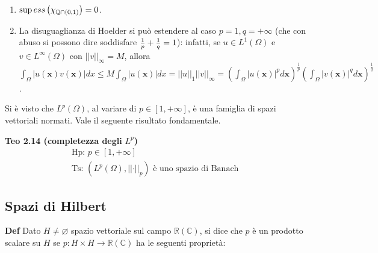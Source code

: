 \documentclass{article}
\begin{document}
\begin{enumerate}
\item $\sup ess\left( \chi _{%
\mathbb{Q}
\cap \left( 0,1\right) }\right) =0$.

\item La disuguaglianza di Hoelder si pu\`{o} estendere al caso $%
p=1,q=+\infty $ (che con abuso si possono dire soddisfare $\frac{1}{p}+\frac{%
1}{q}=1$): infatti, se $u\in L^{1}\left( \Omega \right) $ e $v\in L^{\infty
}\left( \Omega \right) $ con $\left\vert \left\vert v\right\vert \right\vert
_{\infty }=M$, allora $\int_{\Omega }\left\vert u\left( \mathbf{x}\right)
v\left( \mathbf{x}\right) \right\vert dx\leq M\int_{\Omega }\left\vert
u\left( \mathbf{x}\right) \right\vert dx=\left\vert \left\vert u\right\vert
\right\vert _{1}\left\vert \left\vert v\right\vert \right\vert _{\infty
}=\left( \int_{\Omega }\left\vert u\left( \mathbf{x}\right) \right\vert ^{p}d%
\mathbf{x}\right) ^{\frac{1}{p}}\left( \int_{\Omega }\left\vert v\left( 
\mathbf{x}\right) \right\vert ^{q}d\mathbf{x}\right) ^{\frac{1}{q}}$.
\end{enumerate}

Si \`{e} visto che $L^{p}\left( \Omega \right) $, al variare di $p\in \left[
1,+\infty \right] $, \`{e} una famiglia di spazi vettoriali normati. Vale il
seguente risultato fondamentale.

\textbf{Teo 2.14 (completezza degli }$L^{p}$\textbf{)} 
\begin{gather*}
\text{Hp: }p\in \left[ 1,+\infty \right] \\
\text{Ts: }\left( L^{p}\left( \Omega \right) ,\left\vert \left\vert \cdot
\right\vert \right\vert _{p}\right) \text{ \`{e} uno spazio di Banach }
\end{gather*}

\subsection{Spazi di Hilbert}

\textbf{Def} Dato $H\neq \varnothing $ spazio vettoriale sul campo $%
\mathbb{R}
\left( 
\mathbb{C}
\right) $, si dice che $p$ \`{e} un prodotto scalare su $H$ se $p:H\times
H\rightarrow 
\mathbb{R}
\left( 
\mathbb{C}
\right) $ ha le seguenti propriet\`{a}:
\end{document}
